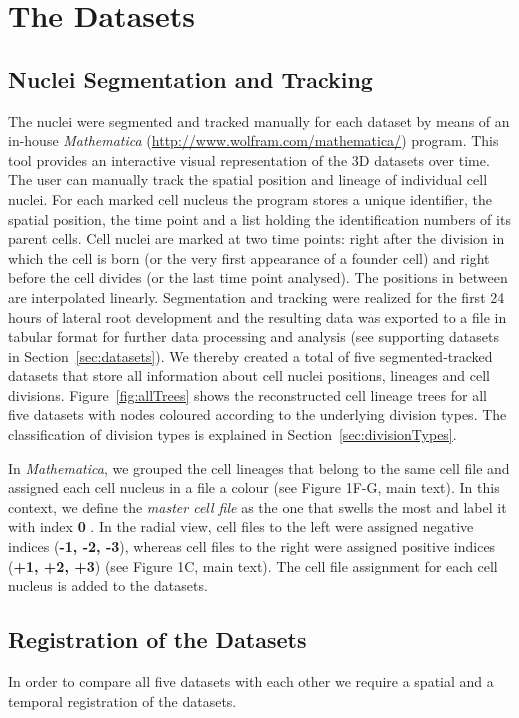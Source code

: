 \documentclass[11pt,a4paper, final]{article}
\begin{document}
\clearpage
\section{The Datasets}
\subsection{Nuclei Segmentation and Tracking}
\label{sec:segmentation}
\noindent
The nuclei were segmented and tracked manually for each dataset by means of an in-house \textit{Mathematica} (\href{http://www.wolfram.com/mathematica/}{http://www.wolfram.com/mathematica/}) program. This tool provides an interactive visual representation of the 3D datasets over time. The user can manually track the spatial position and lineage of individual cell nuclei. For each marked cell nucleus the program stores a unique identifier, the spatial position, the time point and a list holding the identification numbers of its parent cells. Cell nuclei are marked at two time points: right after the division in which the cell is born (or the very first appearance of a founder cell) and right before the cell divides (or the last time point analysed). The positions in between are interpolated linearly. Segmentation and tracking were realized for the first 24 hours of lateral root development and the resulting data was exported to a file in tabular format for further data processing and analysis (see supporting datasets in Section~\ref{sec:datasets}). We thereby created a total of five segmented-tracked datasets that store all information about cell nuclei positions, lineages and cell divisions. Figure~\ref{fig:allTrees} shows the reconstructed cell lineage trees for all five datasets with nodes coloured according to the underlying division types. The classification of division types is explained in Section~\ref{sec:divisionTypes}.

In \textit{Mathematica}, we grouped the cell lineages that belong to the same cell file and assigned each cell nucleus in a file a colour (see Figure 1F-G, main text). In this context, we define the \textit{master cell file} as the one that swells the most and label it with index \textbf{0} \cite{Vermeer:2014fl}. In the radial view, cell files to the left were assigned negative indices (\textbf{-1, -2, -3}), whereas cell files to the right were assigned positive indices (\textbf{+1, +2, +3}) (see Figure 1C, main text). The cell file assignment for each cell nucleus is added to the datasets.

\subsection{Registration of the Datasets}
\label{sec:registration}
\noindent
In order to compare all five datasets with each other we require a spatial and a temporal registration of the datasets. 
\end{document}
